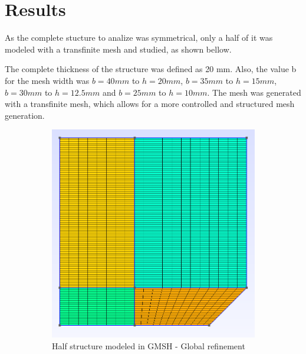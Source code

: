 \section{Results}

As the complete stucture to analize was symmetrical, only a half of it was modeled with a transfinite mesh and studied, as shown bellow.

The complete thickness of the structure was defined as 20 mm. Also, the value b for the mesh width was $b=40mm$ to $h=20mm$, $b=35mm$ to $h=15mm$, $b=30mm$ to $h=12.5mm$ and $b=25mm$ to $h=10mm$. The mesh was generated with a transfinite mesh, which allows for a more controlled and structured mesh generation.

\begin{figure}[H]
    \centering
    \begin{subfigure}[b]{0.48\textwidth}
        \centering
        \includegraphics[width=\textwidth]{img/geometria.png}
        \caption{Half structure modeled in GMSH - Global refinement}
        \label{fig:half_structure_global}
    \end{subfigure}
    \hfill
    \begin{subfigure}[b]{0.48\textwidth}
        \centering

\end{subfigure}
\end{figure}
